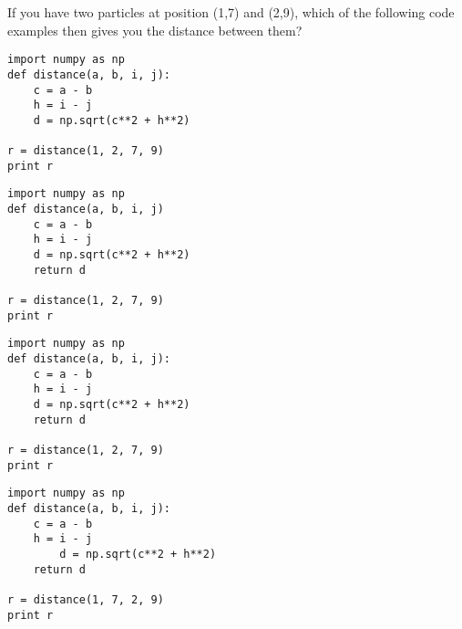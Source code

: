 \documentclass{exam}
\begin{document}
\begin{questions}
\question If you have two particles at position (1,7) and (2,9), which of the following code examples then gives you the distance between them?

\begin{checkboxes}

\choice 
\begin{lstlisting}
import numpy as np
def distance(a, b, i, j):
    c = a - b
    h = i - j
    d = np.sqrt(c**2 + h**2)

r = distance(1, 2, 7, 9)
print r
\end{lstlisting}

\choice
\begin{lstlisting}
import numpy as np
def distance(a, b, i, j)
    c = a - b
    h = i - j
    d = np.sqrt(c**2 + h**2)
    return d

r = distance(1, 2, 7, 9)
print r
\end{lstlisting}

\CorrectChoice
  \begin{lstlisting}
import numpy as np
def distance(a, b, i, j):
    c = a - b
    h = i - j
    d = np.sqrt(c**2 + h**2)
    return d

r = distance(1, 2, 7, 9)
print r
\end{lstlisting}

\newpage
\choice
\begin{lstlisting}
import numpy as np 
def distance(a, b, i, j):
    c = a - b
    h = i - j
        d = np.sqrt(c**2 + h**2)
    return d

r = distance(1, 7, 2, 9)
print r
\end{lstlisting}

\end{checkboxes}
\vspace{1cm}

\end{questions}





\iffalse
\begin{questions}
\question
\begin{checkboxes}
\choice 
\choice
\choice
\choice
\end{checkboxes}
\end{questions}
\fi
\end{document}
